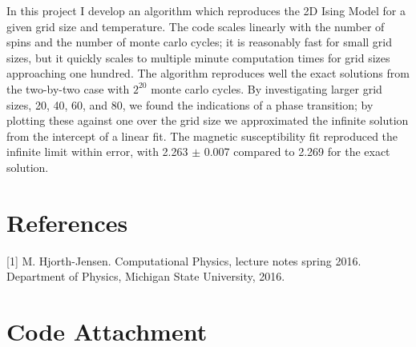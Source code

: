 \documentclass[11pt,a4paper]{article}
\begin{document}
In this project I develop an algorithm which reproduces the 2D Ising Model for a given grid size and temperature. The code scales linearly with the number of spins and the number of monte carlo cycles; it is reasonably fast for small grid sizes, but it quickly scales to multiple minute computation times for grid sizes approaching one hundred. The algorithm reproduces well the exact solutions from the two-by-two case with $2^20$ monte carlo cycles. By investigating larger grid sizes, 20, 40, 60, and 80, we found the indications of a phase transition; by plotting these against one over the grid size we approximated the infinite solution from the intercept of a linear fit. The magnetic susceptibility fit reproduced the infinite limit within error, with 2.263 $\pm$ 0.007 compared to 2.269 for the exact solution.

\section{References}

[1] M. Hjorth-Jensen. Computational Physics, lecture notes spring 2016. Department of Physics, Michigan State University, 2016. \newline

\newpage

\section*{Code Attachment}
\end{document}
